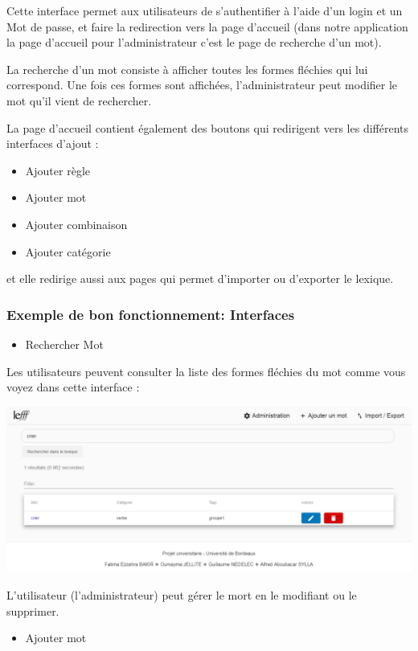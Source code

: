\documentclass[12pt,a4paper]{article}
\begin{document}
Cette interface permet aux utilisateurs de s'authentifier à l’aide d'un login et un Mot de passe, 
et faire la redirection vers la page d'accueil (dans notre application la page d'accueil
pour l'administrateur c'est le page de recherche d'un mot).

La recherche d'un mot consiste à afficher toutes les formes fléchies qui lui correspond. Une fois ces formes sont affichées, 
l'administrateur peut modifier le mot qu'il vient de rechercher.

La page d'accueil contient également des boutons qui redirigent vers les différents interfaces d'ajout : 
\begin{itemize}
    \item   Ajouter règle
    \item   Ajouter mot
    \item   Ajouter combinaison
    \item   Ajouter catégorie
   \end{itemize}
et elle redirige aussi aux  pages qui permet d'importer ou d'exporter le lexique.


\subsubsection{Exemple de bon fonctionnement: Interfaces} 

\begin{itemize}  
  \item Rechercher Mot
\end{itemize}
Les utilisateurs peuvent consulter la liste des formes fléchies du mot comme vous voyez dans cette interface :


\includegraphics[width=150mm]{img/Recherche.PNG}



L’utilisateur (l’administrateur) peut gérer le mort en le modifiant ou le supprimer.


\begin{itemize}  
  \item Ajouter mot
\end{itemize}
\end{document}

